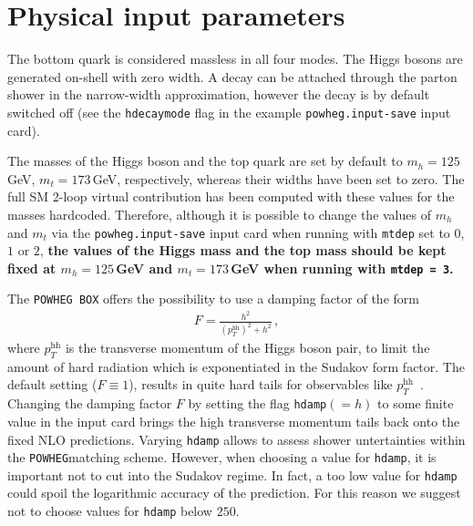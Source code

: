 \documentclass[paper]{JHEP3}
\newcommand\POWHEG{{\tt POWHEG}}
\newcommand\POWHEGBOX{{\tt POWHEG BOX}}
\newcommand\pthh{\ensuremath{p_{T}^{\mathrm{hh}}}\xspace}
\begin{document}
\section{Physical input parameters}

The bottom quark is considered massless in all four modes. The Higgs
bosons are generated on-shell with zero width. A decay can be attached
through the parton shower in the narrow-width approximation, however
the decay is by default switched off (see the {\tt hdecaymode} flag in the
example {\tt powheg.input-save} input card).

The masses of the Higgs boson and the top quark are set by default to
$m_h=125$\,GeV, $m_t=173$\,GeV, respectively, whereas their widths
have been set to zero. The full SM 2-loop virtual contribution has
been computed with these values for the masses hardcoded. 
Therefore, although it is possible to change the values of $m_h$
and $m_t$ via the {\tt powheg.input-save} input card when running with
{\tt mtdep} set to $0$, $1$ or $2$, {\bf the values of the Higgs mass and
the top mass should be kept fixed at $m_h=125$\,GeV and $m_t=173$\,GeV
when running with {\tt mtdep = 3}.}

The \POWHEGBOX{} offers the possibility to use a damping factor of the
form~\cite{Alioli:2008tz,Alioli:2009je}
\begin{align}
  F=\frac{h^{2}}{(\pthh)^2+h^{2}}\,,
\end{align}
where \pthh is the transverse momentum of the Higgs boson pair, to
limit the amount of hard radiation which is exponentiated in the
Sudakov form factor. The default setting ($F\equiv1$), results in
quite hard tails for observables like
$\pthh$~\cite{Heinrich:2017kxx}. Changing the damping factor $F$ by
setting the flag {\tt hdamp}$(=h)$ to some finite value in the input
card brings the high transverse momentum tails back onto the fixed NLO
predictions. Varying {\tt hdamp} allows to assess shower untertainties
within the \POWHEG matching scheme. However, when choosing a value
for {\tt hdamp}, it is important not to cut into the Sudakov
regime. In fact, a too low value for {\tt hdamp} could spoil the
logarithmic accuracy of the prediction. For this reason we suggest not
to choose values for {\tt hdamp} below $250$.
\end{document}
